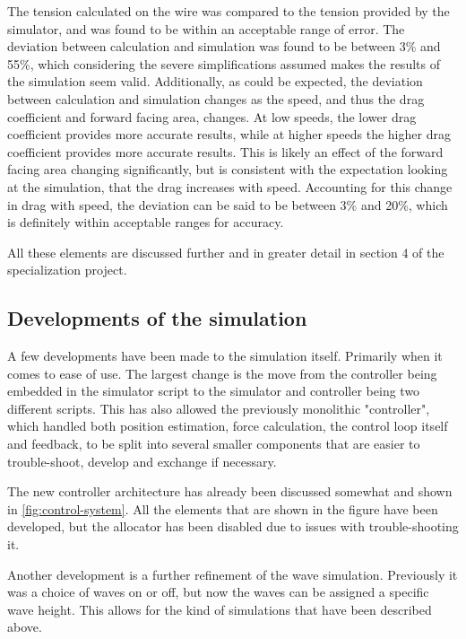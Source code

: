 \documentclass[class=article, crop=false]{standalone}
\begin{document}
The tension calculated on the wire was compared to the tension provided by the simulator, and was found to be within an acceptable range of error. The deviation between calculation and simulation was found to be between 3\% and 55\%, which considering the severe simplifications assumed makes the results of the simulation seem valid. Additionally, as could be expected, the deviation between calculation and simulation changes as the speed, and thus the drag coefficient and forward facing area, changes. At low speeds, the lower drag coefficient provides more accurate results, while at higher speeds the higher drag coefficient provides more accurate results. This is likely an effect of the forward facing area changing significantly, but is consistent with the expectation looking at the simulation, that the drag increases with speed. Accounting for this change in drag with speed, the deviation can be said to be between 3\% and 20\%, which is definitely within acceptable ranges for accuracy.

All these elements are discussed further and in greater detail in section 4 of the specialization project.

\subsection{Developments of the simulation}
A few developments have been made to the simulation itself. Primarily when it comes to ease of use. The largest change is the move from the controller being embedded in the simulator script to the simulator and controller being two different scripts. This has also allowed the previously monolithic "controller", which handled both position estimation, force calculation, the control loop itself and feedback, to be split into several smaller components that are easier to trouble-shoot, develop and exchange if necessary.

The new controller architecture has already been discussed somewhat and shown in \cref{fig:control-system}. All the elements that are shown in the figure have been developed, but the allocator has been disabled due to issues with trouble-shooting it.

Another development is a further refinement of the wave simulation. Previously it was a choice of waves on or off, but now the waves can be assigned a specific wave height. This allows for the kind of simulations that have been described above.
\end{document}
